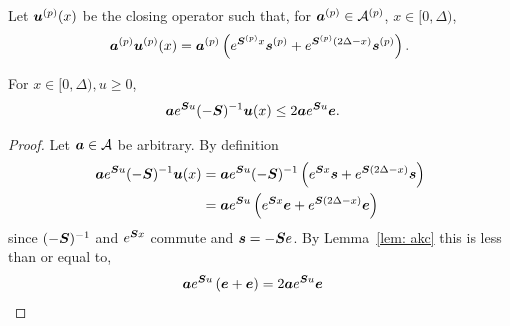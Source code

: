 Let \(\boldsymbol u^{(p)}(x)\) be the closing operator such that, for \(\boldsymbol a^{(p)} \in\mathcal A^{(p)}\), \(x\in[0,\Delta)\),
\[\boldsymbol a^{(p)} {\boldsymbol u}^{(p)}(x) = \boldsymbol a^{(p)} \left(e^{\boldsymbol{S}^{(p)}x}\boldsymbol s^{(p)} + e^{\boldsymbol{S}^{(p)}(2\Delta-x)}\boldsymbol s^{(p)}\right).\]
\begin{lem}\label{lem: akxnj}
	For \(x\in[0,\Delta),u\geq 0\),  
        \begin{align*}
        		\boldsymbol a   e^{\boldsymbol Su}(-\boldsymbol S)^{-1} {\boldsymbol u}(x) &\leq 2 \boldsymbol a e^{\boldsymbol Su} \boldsymbol e.
	\end{align*}
\end{lem}
\begin{proof}
Let \(\boldsymbol a   \in \mathcal A\) be arbitrary. By definition 
	\begin{align*}
        		\boldsymbol a  e^{\boldsymbol Su}(-\boldsymbol S)^{-1} {\boldsymbol u}(x) & = \boldsymbol a  e^{\boldsymbol Su}(-\boldsymbol S)^{-1}  \left(e^{\boldsymbol{S}x}\boldsymbol s + e^{\boldsymbol{S}(2\Delta-x)}\boldsymbol s\right)
				\\& = \boldsymbol a  e^{\boldsymbol Su}  \left(e^{\boldsymbol{S}x}\boldsymbol e + e^{\boldsymbol{S}(2\Delta-x)}\boldsymbol e\right)
	\end{align*}
	since \((-\boldsymbol S)^{-1}\) and \(e^{\boldsymbol Sx}\) commute and \(\boldsymbol s = -\boldsymbol S e\). 
	By Lemma~\ref{lem: akc} this is less than or equal to, 
	\begin{align}
        		& \boldsymbol a   e^{\boldsymbol Su} \left(\boldsymbol e + \boldsymbol e\right) = 2 \boldsymbol a   e^{\boldsymbol Su} \boldsymbol e \label{eqn:mzm}
	\end{align}
\end{proof}


